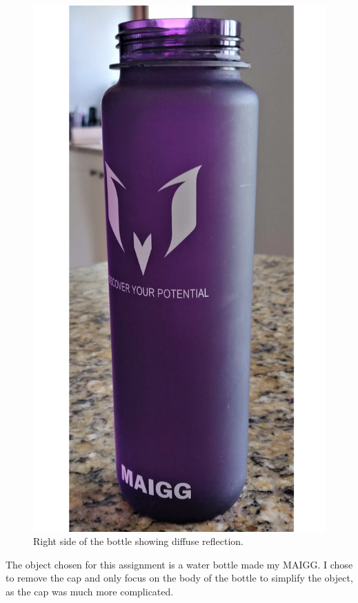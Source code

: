 \documentclass[notitlepage,12pt]{article}
\begin{document}
\begin{figure}[ht]
\begin{minipage}[b]{0.3\textwidth}
        \includegraphics[width=\textwidth]{reference/bottle_right.jpg}
        \caption{Right side of the bottle showing diffuse reflection.}
        \label{fig:right}
    \end{minipage}
\end{figure}

The object chosen for this assignment is a water bottle made my MAIGG. I chose to remove the cap and only focus on the body of the bottle to simplify the object, as the cap was much more complicated.
\end{document}
